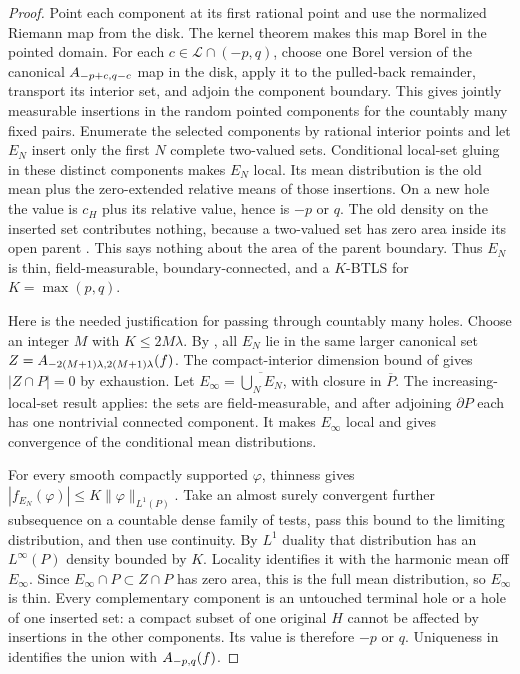 \begin{proof}
Point each component at its first rational point and use the normalized
Riemann map from the disk. The kernel theorem makes this map Borel in
the pointed domain. For each \(c\in\mathcal L\cap(-p,q)\), choose one
Borel version of the canonical \(A_{-p+c,q-c}\) map in the disk,
apply it to the pulled-back remainder, transport its interior set, and
adjoin the component boundary. This gives jointly measurable insertions
in the random pointed components for the countably many fixed pairs.
Enumerate the selected components by rational interior points and let
\(E_N\) insert only the first \(N\) complete two-valued sets.
Conditional local-set gluing in these distinct components makes
\(E_N\) local. Its mean distribution is the old mean plus the
zero-extended relative means of those insertions. On a new hole the
value is \(c_H\) plus its relative value, hence is \(-p\) or \(q\).
The old density on the inserted set contributes nothing, because a
two-valued set has zero area inside its open parent
\cite[Proposition~3.1]{AS2018}. This says nothing about the area of
the parent boundary. Thus \(E_N\) is thin, field-measurable,
boundary-connected, and a \(K\)-BTLS for \(K=\max(p,q)\).

Here is the needed justification for passing through countably many
holes. Choose an integer \(M\) with \(K\le2M\lambda\). By
\cite[Propositions~1 and~3]{ASW2017}, all \(E_N\) lie in the same
larger canonical set
\(Z=A_{-2(M+1)\lambda,2(M+1)\lambda}(f)\).
The compact-interior dimension bound of
\cite[Proposition~3.1]{AS2018} gives \(|Z\cap P|=0\) by exhaustion.
Let \(E_\infty=\overline{\bigcup_N E_N}\), with closure in
\(\overline P\). The increasing-local-set result
\cite[Lemma~2.3(3)]{ALS2017} applies: the sets are field-measurable,
and after adjoining \(\partial P\) each has one nontrivial connected
component. It makes \(E_\infty\) local and gives convergence of the
conditional mean distributions.

For every smooth compactly supported \(\varphi\), thinness gives
\(|f_{E_N}(\varphi)|\le K\|\varphi\|_{L^1(P)}\). Take an almost surely
convergent further subsequence on a countable dense family of tests,
pass this bound to the limiting distribution, and then use continuity.
By \(L^1\) duality that distribution has an
\(L^\infty(P)\) density bounded by \(K\). Locality identifies it
with the harmonic mean off \(E_\infty\). Since
\(E_\infty\cap P\subset Z\cap P\) has zero area, this is the full
mean distribution, so \(E_\infty\) is thin. Every complementary
component is an untouched terminal hole or a hole of one inserted
set: a compact subset of one original \(H\) cannot be affected by
insertions in the other components. Its value is therefore \(-p\)
or \(q\). Uniqueness in \cite[Proposition~2]{ASW2017} identifies
the union with \(A_{-p,q}(f)\).


\end{proof}
